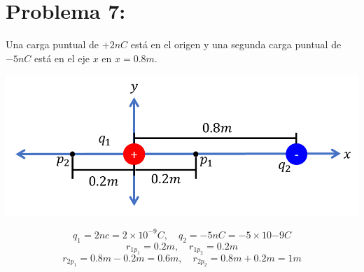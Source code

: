 \documentclass[12pt]{article}
\begin{document}
		\section{Problema 7:}\label{sec:Problema7}
			Una carga puntual de $ +2nC $ está en el origen y una segunda carga puntual de $ -5nC $
			está en el eje $ x $ en $ x = 0.8m $.
			\begin{center}
				\includegraphics[width=.5\linewidth]{Imp7t1.png} 
			\end{center}
			$$ q_1 = 2nc = 2 \times 10^{-9}C, \quad q_2 = -5nC = -5 \times 10{-9}C $$
			$$ r_{1p_1} = 0.2m, \quad r_{1p_2} = 0.2m $$
			$$ r_{2p_1} = 0.8m - 0.2m = 0.6m , \quad r_{2p_2} = 0.8m + 0.2m = 1m $$
\end{document}
